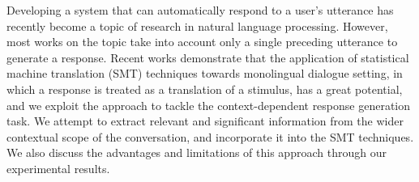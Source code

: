 Developing a system that can automatically respond to a user's utterance has recently become a topic of research in natural language processing. However, most works on the topic take into account only a single preceding utterance to generate a response. Recent works demonstrate that the application of statistical machine translation (SMT) techniques towards monolingual dialogue setting, in which a response is treated as a translation of a stimulus, has a great potential, and we exploit the approach to tackle the context-dependent response generation task. We attempt to extract relevant and significant information from the wider contextual scope of the conversation, and incorporate it into the SMT techniques. We also discuss the advantages and limitations of this approach through our experimental results.
